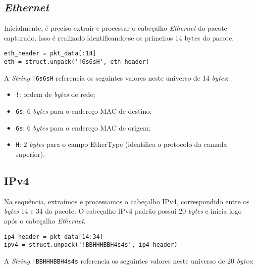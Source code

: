 \documentclass[12pt]{article}
\begin{document}
\subsection{\emph{Ethernet}}
Inicialmente, é preciso extrair e processar o cabeçalho \emph{Ethernet} do pacote capturado. Isso é realizado identificando-se os primeiros 14 bytes do pacote.

\begin{lstlisting}[style=vscode]
eth_header = pkt_data[:14]
eth = struct.unpack('!6s6sH', eth_header)
\end{lstlisting}

\quad A \emph{String} \texttt{!6s6sH} referencia os seguintes valores neste universo de 14 \emph{bytes}:

\begin{itemize}
    \item \texttt{!}: ordem de \emph{bytes} de rede;
    \item \texttt{6s}: 6 \emph{bytes} para o endereço MAC de destino;
    \item \texttt{6s}: 6 \emph{bytes} para o endereço MAC de origem;
    \item \texttt{H}: 2 \emph{bytes} para o campo EtherType (identifica o protocolo da camada superior).
\end{itemize}

\subsection{IPv4}
Na sequência, extraímos e processamos o cabeçalho IPv4, correspondido entre os \emph{bytes} 14 e 34 do pacote. O cabeçalho IPv4 padrão possui 20 \emph{bytes} e inicia logo após o cabeçalho \emph{Ethernet}.

\begin{lstlisting}[style=vscode]
ip4_header = pkt_data[14:34]
ipv4 = struct.unpack('!BBHHHBBH4s4s', ip4_header)
\end{lstlisting}

\quad A \emph{String} \texttt{!BBHHHBBH4s4s} referencia os seguintes valores neste universo de 20 \emph{bytes}:
\end{document}
